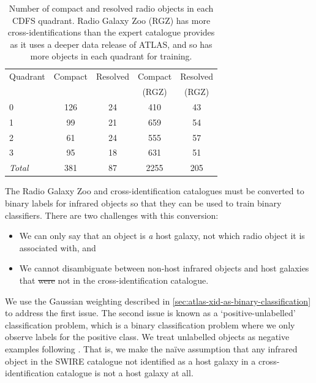 \documentclass[11pt, a4paper]{book}
\providecommand{\DIFaddtex}[1]{{\protect\color{blue}\uwave{#1}}} %
\providecommand{\DIFdeltex}[1]{{\protect\color{red}\sout{#1}}}                      %
\providecommand{\DIFaddbegin}{} %
\providecommand{\DIFaddend}{} %
\providecommand{\DIFdelbegin}{} %
\providecommand{\DIFdelend}{} %
\providecommand{\DIFadd}[1]{\texorpdfstring{\DIFaddtex{#1}}{#1}} %
\providecommand{\DIFdel}[1]{\texorpdfstring{\DIFdeltex{#1}}{}} %
\newcommand{\DIFscaledelfig}{0.5}
\newlength{\DIFdelgraphicswidth} %
\newlength{\DIFdelgraphicsheight} %
\newcommand{\DIFaddincludegraphics}[2][]{{\color{blue}\fbox{\DIFOincludegraphics[#1]{#2}}}} %
\newcommand{\DIFdelincludegraphics}[2][]{%
\sbox{\DIFdelgraphicsbox}{\DIFOincludegraphics[#1]{#2}}%
\settoboxwidth{\DIFdelgraphicswidth}{\DIFdelgraphicsbox} %
\settoboxtotalheight{\DIFdelgraphicsheight}{\DIFdelgraphicsbox} %
\scalebox{\DIFscaledelfig}{%
\parbox[b]{\DIFdelgraphicswidth}{\usebox{\DIFdelgraphicsbox}\\[-\baselineskip] \rule{\DIFdelgraphicswidth}{0em}}\llap{\resizebox{\DIFdelgraphicswidth}{\DIFdelgraphicsheight}{%
\setlength{\unitlength}{\DIFdelgraphicswidth}%
\begin{picture}(1,1)%
\thicklines\linethickness{2pt} %
{\color[rgb]{1,0,0}\put(0,0){\framebox(1,1){}}}%
{\color[rgb]{1,0,0}\put(0,0){\line( 1,1){1}}}%
{\color[rgb]{1,0,0}\put(0,1){\line(1,-1){1}}}%
\end{picture}%
}\hspace*{3pt}}} %
} %
\DeclareRobustCommand{\DIFaddbegin}{\DIFOaddbegin \let\includegraphics\DIFaddincludegraphics} %
\DeclareRobustCommand{\DIFaddend}{\DIFOaddend \let\includegraphics\DIFOincludegraphics} %
\DeclareRobustCommand{\DIFdelbegin}{\DIFOdelbegin \let\includegraphics\DIFdelincludegraphics} %
\DeclareRobustCommand{\DIFdelend}{\DIFOaddend \let\includegraphics\DIFOincludegraphics} %
\begin{document}
    \begin{table}
      \caption[Number of compact and resolved radio objects in each CDFS
      quadrant.]{Number of compact and resolved radio objects in each CDFS
      quadrant. Radio Galaxy Zoo (RGZ) has more cross-identifications than the
      expert catalogue \citep{norris06} provides as it uses a deeper data release of ATLAS, and
      so has more objects in each quadrant for training.}
      \label{tab:radio-count}
      \centering
      \begin{tabular}{lcccc}
        \hline\hline
        Quadrant & Compact & Resolved & Compact & Resolved\\
        &&&(RGZ)&(RGZ)\\
        \hline
        0 & 126 & 24 & 410 & 43 \\
        1 & 99 & 21 & 659 & 54 \\
        2 & 61 & 24 & 555 & 57 \\
        3 & 95 & 18 & 631 & 51 \\
        \hline
        \textit{Total} & 381 & 87 & 2255 & 205\\
        \hline\hline
      \end{tabular}
    \end{table}

    {The Radio Galaxy Zoo and \citet{norris06} cross-identification
    catalogues must be converted to binary labels for infrared objects so that
    they can be used to train binary classifiers. There are two challenges with this conversion:
    \begin{itemize}
      \item We can only say that an object is \emph{a} host galaxy, not which radio object it is associated with, and
      \item We cannot disambiguate between non-host infrared objects and host galaxies that \DIFdelbegin \DIFdel{were }\DIFdelend \DIFaddbegin \DIFadd{are }\DIFaddend not in the cross-identification catalogue.
    \end{itemize}

    We use the Gaussian weighting described in \autoref{sec:atlas-xid-as-binary-classification} to address the first issue.
    The second issue is known as a `positive-unlabelled' classification problem, which is
    a binary classification problem where we only observe labels for the
    positive class. We treat unlabelled objects as negative examples following
    \citet{menon15cpe}. That is, we make the na\"ive assumption that any
    infrared object in the SWIRE catalogue not identified as a host galaxy in a cross-identification catalogue is not a host galaxy at all.}
\end{document}
